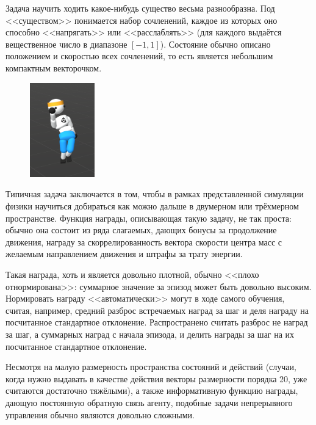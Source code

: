 \begin{example}
Задача научить ходить какое-нибудь существо весьма разнообразна. Под <<существом>> понимается набор сочленений, каждое из которых оно способно <<напрягать>> или <<расслаблять>> (для каждого выдаётся вещественное число в диапазоне $[-1, 1]$). Состояние обычно описано положением и скоростью всех сочленений, то есть является небольшим компактным векторочком. 

\begin{figure}
\centering
\vspace{-0.3cm}
\includegraphics[width=0.25\textwidth]{Images/Dancer.png}
\vspace{-0.8cm}
\end{figure}

Типичная задача заключается в том, чтобы в рамках представленной симуляции физики научиться добираться как можно дальше в двумерном или трёхмерном пространстве. Функция награды, описывающая такую задачу, не так проста: обычно она состоит из ряда слагаемых, дающих бонусы за продолжение движения, награду за скоррелированность вектора скорости центра масс с желаемым направлением движения и штрафы за трату энергии.

\begin{remark}
Такая награда, хоть и является довольно плотной, обычно <<плохо отнормирована>>: суммарное значение за эпизод может быть довольно высоким. Нормировать награду <<автоматически>> могут в ходе самого обучения, считая, например, средний разброс встречаемых наград за шаг и деля награду на посчитанное стандартное отклонение. Распространено считать разброс не наград за шаг, а суммарных наград с начала эпизода, и делить награды за шаг на их посчитанное стандартное отклонение.
\end{remark}

Несмотря на малую размерность пространства состояний и действий (случаи, когда нужно выдавать в качестве действия векторы размерности порядка 20, уже считаются достаточно тяжёлыми), а также информативную функцию награды, дающую постоянную обратную связь агенту, подобные задачи непрерывного управления обычно являются довольно сложными.
\end{example}

